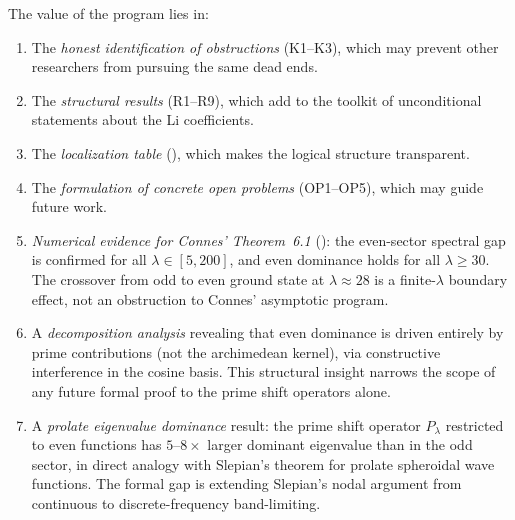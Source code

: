 \documentclass[12pt,a4paper]{article}
\theoremstyle{definition}
\theoremstyle{remark}
\begin{document}
The value of the program lies in:
\begin{enumerate}
  \item The \emph{honest identification of obstructions} (K1--K3), which may prevent other researchers from pursuing the same dead ends.
  \item The \emph{structural results} (R1--R9), which add to the toolkit of unconditional statements about the Li coefficients.
  \item The \emph{localization table} (), which makes the logical structure transparent.
  \item The \emph{formulation of concrete open problems} (OP1--OP5), which may guide future work.
  \item \emph{Numerical evidence for Connes' Theorem~6.1} (): the even-sector spectral gap is confirmed for all $\lambda \in [5,200]$, and even dominance holds for all $\lambda \geq 30$. The crossover from odd to even ground state at $\lambda \approx 28$ is a finite-$\lambda$ boundary effect, not an obstruction to Connes' asymptotic program.
  \item A \emph{decomposition analysis} revealing that even dominance is driven entirely by prime contributions (not the archimedean kernel), via constructive interference in the cosine basis. This structural insight narrows the scope of any future formal proof to the prime shift operators alone.
  \item A \emph{prolate eigenvalue dominance} result: the prime shift operator $P_\lambda$ restricted to even functions has $5$--$8\times$ larger dominant eigenvalue than in the odd sector, in direct analogy with Slepian's theorem for prolate spheroidal wave functions. The formal gap is extending Slepian's nodal argument from continuous to discrete-frequency band-limiting.
\end{enumerate}



\end{document}
